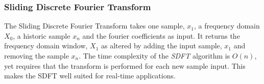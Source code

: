 \subsubsection{Sliding Discrete Fourier Transform}\label{appendix:SDFT}
The Sliding Discrete Fourier Transform takes one sample, $x_1$, a frequency
domain $X_0$, a historic sample $x_n$ and the fourier coefficients as input.
It returns the frequency domain window, $X_1$ as altered by adding the input
sample, $x_1$ and removing the sample $x_n$. The time complexity of the {\it SDFT}
algorithm is $O(n)$, yet requires that the transform is performed for each 
new sample input. This makes the SDFT well suited for real-time applications.

